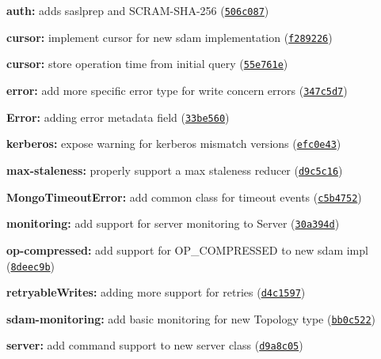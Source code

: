 \begin{DoxyItemize}
\item {\bfseries auth\+:} adds saslprep and S\+C\+R\+A\+M-\/\+S\+H\+A-\/256 (\href{https://github.com/mongodb-js/mongodb-core/commit/506c087}{\tt 506c087})
\item {\bfseries cursor\+:} implement cursor for new sdam implementation (\href{https://github.com/mongodb-js/mongodb-core/commit/f289226}{\tt f289226})
\item {\bfseries cursor\+:} store operation time from initial query (\href{https://github.com/mongodb-js/mongodb-core/commit/55e761e}{\tt 55e761e})
\item {\bfseries error\+:} add more specific error type for write concern errors (\href{https://github.com/mongodb-js/mongodb-core/commit/347c5d7}{\tt 347c5d7})
\item {\bfseries Error\+:} adding error metadata field (\href{https://github.com/mongodb-js/mongodb-core/commit/33be560}{\tt 33be560})
\item {\bfseries kerberos\+:} expose warning for kerberos mismatch versions (\href{https://github.com/mongodb-js/mongodb-core/commit/efc0e43}{\tt efc0e43})
\item {\bfseries max-\/staleness\+:} properly support a max staleness reducer (\href{https://github.com/mongodb-js/mongodb-core/commit/d9c5c16}{\tt d9c5c16})
\item {\bfseries Mongo\+Timeout\+Error\+:} add common class for timeout events (\href{https://github.com/mongodb-js/mongodb-core/commit/c5b4752}{\tt c5b4752})
\item {\bfseries monitoring\+:} add support for server monitoring to {\ttfamily Server} (\href{https://github.com/mongodb-js/mongodb-core/commit/30a394d}{\tt 30a394d})
\item {\bfseries op-\/compressed\+:} add support for O\+P\+\_\+\+C\+O\+M\+P\+R\+E\+S\+S\+ED to new sdam impl (\href{https://github.com/mongodb-js/mongodb-core/commit/8deec9b}{\tt 8deec9b})
\item {\bfseries retryable\+Writes\+:} adding more support for retries (\href{https://github.com/mongodb-js/mongodb-core/commit/d4c1597}{\tt d4c1597})
\item {\bfseries sdam-\/monitoring\+:} add basic monitoring for new Topology type (\href{https://github.com/mongodb-js/mongodb-core/commit/bb0c522}{\tt bb0c522})
\item {\bfseries server\+:} add {\ttfamily command} support to new server class (\href{https://github.com/mongodb-js/mongodb-core/commit/d9a8c05}{\tt d9a8c05})

\end{DoxyItemize}
